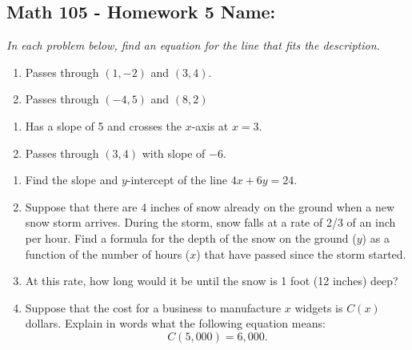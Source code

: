 \documentclass[11pt]{article}
\begin{document}
\pagestyle{empty}
\subsection*{Math 105 - Homework 5 \hfill Name: \underline{\hspace*{2in}}}


\noindent 
\textit{In each problem below, find an equation for the line that fits the description.}
\begin{multicols}{2}
\begin{enumerate}
\setcounter{enumi}{\theenumCount}
\item Passes through $(1,-2)$ and $(3,4)$.
\item Passes through $(-4,5)$ and $(8,2)$ 
\setcounter{enumCount}{\theenumi}
\end{enumerate}
\end{multicols}
\vfill




\begin{multicols}{2}
\begin{enumerate}
\setcounter{enumi}{\theenumCount}
\item Has a slope of 5 and crosses the $x$-axis at $x=3$.
\item Passes through $(3,4)$ with slope of $-6$.
\setcounter{enumCount}{\theenumi}
\end{enumerate}
\end{multicols}
\vfill


\begin{enumerate}
\setcounter{enumi}{\theenumCount}
\item Find the slope and $y$-intercept of the line $4x + 6y = 24$.
\vfill


\item Suppose that there are 4 inches of snow already on the ground when a new snow storm arrives.  During the storm, snow falls at a rate of 2/3 of an inch per hour.  Find a formula for the depth of the snow on the ground ($y$) as a function of the number of hours ($x$) that have passed since the storm started. 
\vfill

\item At this rate, how long would it be until the snow is 1 foot (12 inches) deep?  
\vfill


\newpage

\item  Suppose that the cost for a business to manufacture $x$ widgets is $C(x)$ dollars.  Explain in words what the following equation means:
$$C(5{,}000) = 6{,}000.$$
\vfill
\setcounter{enumCount}{\theenumi}
\end{enumerate}
\end{document}
